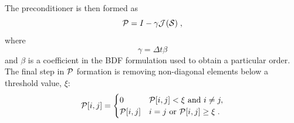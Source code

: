 \documentclass[twocolumn,10pt]{article}
\begin{document}
The preconditioner is then formed as
\begin{equation}
    \mathcal{P} = I - \gamma \mathcal{J}^{}(\mathcal{S}{}) \;,
\end{equation}
where
\begin{equation}
    \gamma = \Delta t \beta
\end{equation}
and $\beta$ is a coefficient in the BDF formulation used to obtain a particular order.
The final step in $\mathcal{P}$ formation is removing non-diagonal elements below a threshold value, $\xi$:
\begin{equation}
    \mathcal{P}[i,j] =
    \begin{cases}
        0 & \mathcal{P}[i,j] < \xi \text{ and } i \neq j, \\
        \mathcal{P}[i,j] & i = j \text{ or } \mathcal{P}[i,j] \geq \xi\;.
    \end{cases}
\end{equation}
\end{document}
